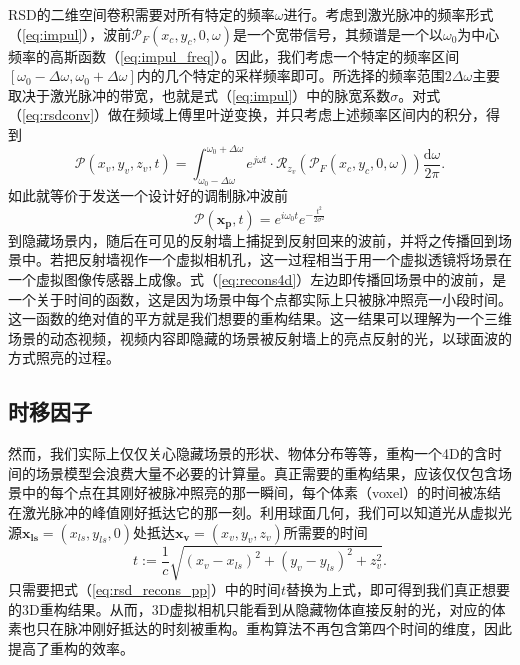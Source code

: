 \documentclass[master]{shtthesis}             %
\begin{document}
RSD的二维空间卷积需要对所有特定的频率$\omega$进行。考虑到激光脉冲的频率形式（\ref{eq:impul}），波前$\mathcal{P}_F(x_c,y_c,0,\omega)$是一个宽带信号，其频谱是一个以$\omega_0$为中心频率的高斯函数（\ref{eq:impul_freq}）。因此，我们考虑一个特定的频率区间$[\omega_0-\Delta \omega, \omega_0+\Delta \omega]$内的几个特定的采样频率即可。所选择的频率范围$2\Delta\omega$主要取决于激光脉冲的带宽，也就是式（\ref{eq:impul}）中的脉宽系数$\sigma$。对式（\ref{eq:rsdconv}）做在频域上傅里叶逆变换，并只考虑上述频率区间内的积分，得到
\begin{equation}\label{eq:recons4d}
  \mathcal{P}(x_v,y_v,z_v,t)=\int_{\omega_0-\Delta \omega}^{\omega_0+\Delta \omega} e^{j\omega t}\cdot \mathcal{R}_{z_v}\left( \mathcal{P}_F(x_c,y_c,0,\omega) \right) \frac{\text{d}\omega}{2\pi} .
\end{equation}
如此就等价于发送一个设计好的调制脉冲波前
\begin{equation}
  \mathcal{P}(\mathbf{x_p},t)=e^{i\omega_0 t}e^{-\frac{t^2}{2\sigma^2}}
\end{equation} 
到隐藏场景内，随后在可见的反射墙上捕捉到反射回来的波前，并将之传播回到场景中。若把反射墙视作一个虚拟相机孔，这一过程相当于用一个虚拟透镜将场景在一个虚拟图像传感器上成像。式（\ref{eq:recons4d}）左边即传播回场景中的波前，是一个关于时间的函数，这是因为场景中每个点都实际上只被脉冲照亮一小段时间。这一函数的绝对值的平方就是我们想要的重构结果。这一结果可以理解为一个三维场景的动态视频，视频内容即隐藏的场景被反射墙上的亮点反射的光，以球面波的方式照亮的过程。

\subsection{时移因子}

然而，我们实际上仅仅关心隐藏场景的形状、物体分布等等，重构一个4D的含时间的场景模型会浪费大量不必要的计算量。真正需要的重构结果，应该仅仅包含场景中的每个点在其刚好被脉冲照亮的那一瞬间，每个体素（voxel）的时间被冻结在激光脉冲的峰值刚好抵达它的那一刻。利用球面几何，我们可以知道光从虚拟光源$\mathbf{x_{ls}}=(x_{ls},y_{ls},0)$处抵达$\mathbf{x_v}=(x_v,y_v,z_v)$所需要的时间
\begin{equation}\label{eq:trav_time}
  t := \frac{1}{c}\sqrt{(x_v-x_{ls})^2+(y_v-y_{ls})^2+z_v^2}.
\end{equation}  
只需要把式（\ref{eq:rsd_recons_pp}）中的时间$t$替换为上式，即可得到我们真正想要的3D重构结果。从而，3D虚拟相机只能看到从隐藏物体直接反射的光，对应的体素也只在脉冲刚好抵达的时刻被重构。重构算法不再包含第四个时间的维度，因此提高了重构的效率。
\end{document}

